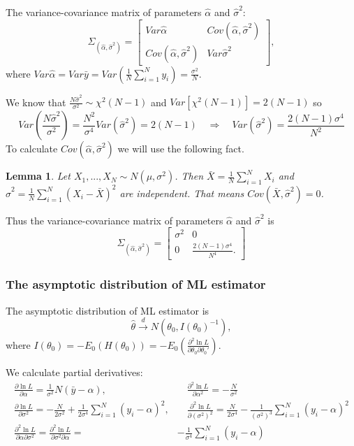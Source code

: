 \documentclass[12pt, a4paper]{article}\usepackage[]{graphicx}\usepackage[]{color}
\newtheorem{lemma}{Lemma}
\begin{document}
The variance-covariance matrix of parameters $\hat{\alpha}$ and $\hat{\sigma}^{2}$:
\[
  \Sigma_{(\hat{\alpha},\hat{\sigma}^{2})}=
  \begin{bmatrix}  
    Var\hat{\alpha} & Cov(\hat{\alpha},\hat{\sigma}^{2})\\
    Cov(\hat{\alpha},\hat{\sigma}^{2}) & Var\hat{\sigma}^{2}
  \end{bmatrix},
\]
where $ Var\hat{\alpha}=Var\bar{y}=Var\left(\frac{1}{N}\sum^{N}_{i=1}y_{i}\right)=\frac{\sigma^{2}}{N} $.

We know that $\frac{N\hat{\sigma}^{2}}{\sigma^{2}}\sim\chi^{2}(N-1)$ and $Var[\chi^{2}(N-1)]=2(N-1)$ so
\[
Var\left(\frac{N\hat{\sigma}^{2}}{\sigma^{2}}\right)=\frac{N^2}{\sigma^{4}}Var(\hat{\sigma}^{2})=2(N-1)
\quad \Rightarrow \quad
Var(\hat{\sigma}^{2})=\frac{2(N-1)\sigma^{4}}{N^{2}}
\]
To calculate $Cov(\hat{\alpha},\hat{\sigma}^{2})$ we will use the following fact.
%
\begin{lemma}
Let $X_{1},...,X_{N}\sim N(\mu,\sigma^{2})$.
Then $\bar{X}=\frac{1}{N}\sum_{i=1}^{N}X_{i}$ and $\hat{\sigma}^{2}=\frac{1}{N}\sum_{i=1}^{N}(X_i-\bar{X})^{2}$ are independent. 
That means $Cov(\bar{X},\hat{\sigma}^{2})=0$.
\end{lemma}
%
Thus the variance-covariance matrix of parameters $\hat{\alpha}$ and $\hat{\sigma}^{2}$ is
\[
  \Sigma_{(\hat{\alpha},\hat{\sigma}^{2})}=
  \begin{bmatrix}  
    \sigma^{2} & 0\\
    0 & \frac{2(N-1)\sigma^{4}}{N^{4}}.
  \end{bmatrix}
\]


\subsubsection{The asymptotic distribution of ML estimator}

The asymptotic distribution of ML estimator is
\[\hat{\theta}\xrightarrow[]{d}N(\theta_0, I(\theta_0)^{-1}),\]
where $I(\theta_{0}) = -E_0(H(\theta_{0})) = -E_0\left(\frac{\partial^{2}\ln{L}}{\partial\theta_{0}\partial\theta_{0}'}\right)$.

We calculate partial derivatives:
\begin{align*}
\frac{\partial\ln{L}}{\partial\alpha}=\frac{1}{\sigma^2}N(\bar{y}-\alpha), & \quad \frac{\partial^{2}\ln{L}}{\partial\alpha^{2}}=-\frac{N}{\sigma^{2}} \\
\frac{\partial\ln{L}}{\partial\sigma^{2}}=-\frac{N}{2\sigma^{2}}+\frac{1}{2\sigma^{4}}\sum_{i=1}^{N}(y_{i}-\alpha)^{2}, & \quad
  \frac{\partial^{2}\ln{L}}{\partial(\sigma^{2})^{2}}=\frac{N}{2\sigma^{4}}-\frac{1}{(\sigma^{2})^{3}}\sum_{i=1}^{N}(y_{i}-\alpha)^2 \\
\frac{\partial^{2}\ln{L}}{\partial\alpha\partial\sigma^{2}} =\frac{\partial^{2}\ln{L}}{\partial\sigma^{2}\partial\alpha}=&-\frac{1}{\sigma^{4}}\sum_{i=1}^{N}(y_{i}-\alpha)
\end{align*}
\end{document}
